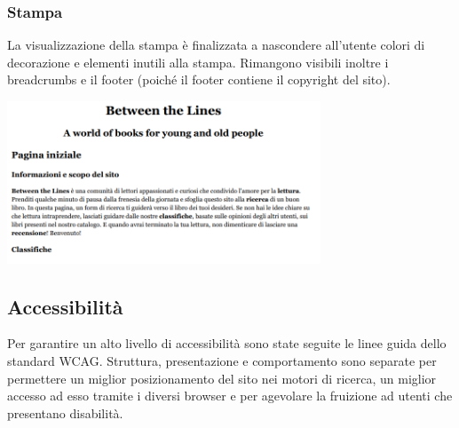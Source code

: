 \documentclass[12pt,a4paper,headings=optiontohead]{article}
\begin{document}
	\subsubsection{Stampa}
	La visualizzazione della stampa è finalizzata a nascondere all'utente colori di decorazione e elementi inutili alla stampa. Rimangono visibili inoltre i breadcrumbs e il footer (poiché il footer contiene il copyright del sito).
	\begin{center}
		\includegraphics[width=0.7\textwidth]{layout_relazione/stampa.png}
	\end{center}
	
	\subsection{Accessibilità}
	Per garantire un alto livello di accessibilità sono state seguite le linee guida dello standard WCAG. Struttura, presentazione e comportamento sono separate per permettere un miglior posizionamento del sito nei motori di ricerca, un miglior accesso ad esso tramite i diversi browser e per agevolare la fruizione ad utenti che presentano disabilità.
	
\end{document}
